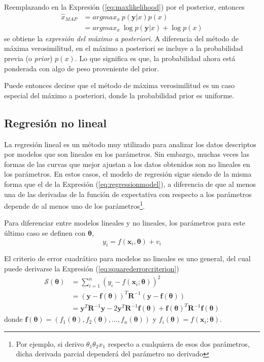 Reemplazando en la Expresión (\ref{eq:maxlikelihood}) por el posterior, entonces
\begin{align}
    \hat{x}_{MAP} &= argmax_x\ p(\bm{y}|x)p(x) \\
                  &= argmax_x\ \log p(\bm{y}|x) + \log p(x)
\end{align}
se obtiene la \textit{expresión del máximo a posteriori}. A diferencia del método de máxima verosimilitud, en el máximo a posteriori se incluye a la probabilidad previa (o \textit{prior}) $p(x)$. Lo que significa es que, la probabilidad ahora está ponderada con algo de peso proveniente del prior.

Puede entonces decirse que el método de máxima verosimilitud es un caso especial del máximo a posteriori, donde la probabilidad prior es uniforme.

\subsection{Regresión no lineal}

La regresión lineal es un método muy utilizado para analizar los datos descriptos por modelos que son lineales en los parámetros. Sin embargo, muchas veces las formas de las curvas que mejor ajustan a los datos obtenidos son no lineales en los parámetros. En estos casos, el modelo de regresión sigue siendo de la misma forma que el de la Expresión (\ref{eq:regressionmodel}), a diferencia de que al menos una de las derivadas de la función de expectativa con respecto a los parámetros depende de al menos uno de los parámetros\footnote{Por ejemplo, si derivo $\theta_1 \theta_2 x_1$ respecto a cualquiera de esos dos parámetros, dicha derivada parcial dependerá del parámetro no derivado}.

Para diferenciar entre modelos lineales y no lineales, los parámetros para este último caso se definen con $\bm{\theta}$,
\begin{equation}
    y_i = f(\bm{x}_i, \bm{\theta}) + v_i
    \label{eq:nonlinearregressionmodel}
\end{equation}

El criterio de error cuadrático para modelos no lineales es uno general, del cual puede derivarse la Expresión (\ref{eq:squarederrorcriterion})
\begin{align}
    \mathscr{S}(\bm{\theta}) &= \sum_{i=1}^n (y_i - f(\bm{x}_i;\bm{\theta}))^2 \\
                   &= (\bm{y} - \bm{f}(\bm{\theta}))^T\bm{R}^{-1}(\bm{y} - \bm{f}(\bm{\theta})) \\
                   &= \bm{y}^T \bm{R}^{-1}\bm{y} - 2\bm{y}^T\bm{R}^{-1}\bm{f}(\bm{\theta}) + \bm{f}(\bm{\theta})^T\bm{R}^{-1}\bm{f}(\bm{\theta})
    \label{eq:generalsquarederrorcriterion}
\end{align}
donde $\bm{f}(\bm{\theta}) = (f_1(\bm{\theta}), f_2(\bm{\theta}), ..., f_n(\bm{\theta}))$ y $f_i(\bm{\theta}) = f(\bm{x}_i;\bm{\theta})$.


